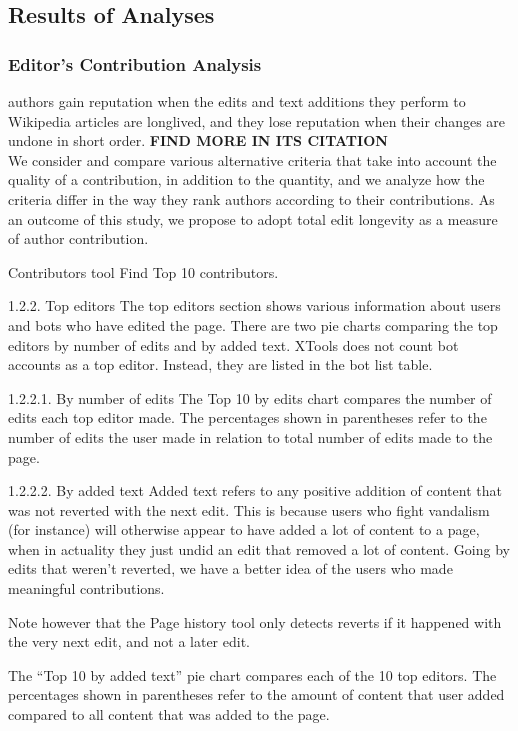 \documentclass[12pt]{article}
\begin{document}
\subsection{Results of Analyses}


\subsubsection{Editor's Contribution Analysis}
\cite{adler2007content} authors gain reputation when the edits and text
additions they perform to Wikipedia articles are longlived, and they lose reputation when their changes are
undone in short order. \textbf{FIND MORE IN ITS CITATION} \\
\cite{adler2008measuring} We consider and compare various alternative criteria that take into account the quality of a contribution, in addition to the quantity, and we analyze how the criteria differ in the way they rank authors according to their contributions. As an outcome of this study, we propose to adopt total edit longevity as a measure of author contribution.

 Contributors tool 
 Find Top 10 contributors. 

1.2.2. Top editors
The top editors section shows various information about users and bots who have edited the page. There are two pie charts comparing the top editors by number of edits and by added text. XTools does not count bot accounts as a top editor. Instead, they are listed in the bot list table.

1.2.2.1. By number of edits
The Top 10 by edits chart compares the number of edits each top editor made. The percentages shown in parentheses refer to the number of edits the user made in relation to total number of edits made to the page.

1.2.2.2. By added text
Added text refers to any positive addition of content that was not reverted with the next edit. This is because users who fight vandalism (for instance) will otherwise appear to have added a lot of content to a page, when in actuality they just undid an edit that removed a lot of content. Going by edits that weren't reverted, we have a better idea of the users who made meaningful contributions.

Note however that the Page history tool only detects reverts if it happened with the very next edit, and not a later edit.

The “Top 10 by added text” pie chart compares each of the 10 top editors. The percentages shown in parentheses refer to the amount of content that user added compared to all content that was added to the page.
\end{document}
